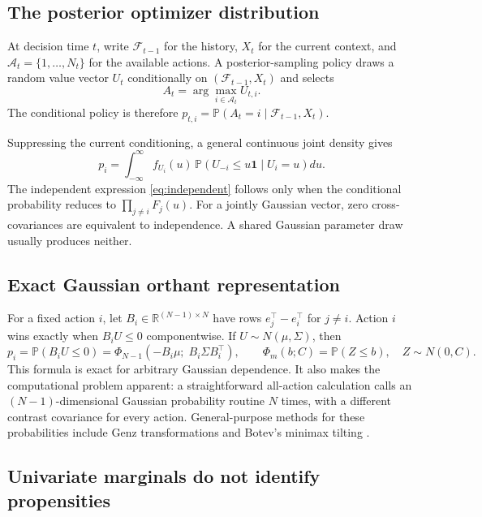 \documentclass[11pt]{article}
\newcommand{\Prob}{\mathbb{P}}
\newcommand{\R}{\mathbb{R}}
\newcommand{\ind}{\mathbf{1}}
\begin{document}
\subsection{The posterior optimizer distribution}

At decision time $t$, write $\mathcal{F}_{t-1}$ for the history, $X_t$ for the current context, and $\mathcal{A}_t = \{1, \ldots, N_t\}$ for the available actions. A posterior-sampling policy draws a random value vector $U_t$ conditionally on $(\mathcal{F}_{t-1}, X_t)$ and selects
\[
A_t = \arg\max_{i \in \mathcal{A}_t} U_{t,i}.
\]
The conditional policy is therefore $p_{t,i} = \Prob(A_t = i \mid \mathcal{F}_{t-1}, X_t)$.

Suppressing the current conditioning, a general continuous joint density gives
\[
p_i
=
\int_{-\infty}^{\infty}
f_{U_i}(u)\,
\Prob\!\left( U_{-i} \le u \ind \mid U_i = u \right)
du.
\]
The independent expression \eqref{eq:independent} follows only when the conditional probability reduces to $\prod_{j \ne i} F_j(u)$. For a jointly Gaussian vector, zero cross-covariances are equivalent to independence. A shared Gaussian parameter draw usually produces neither.

\subsection{Exact Gaussian orthant representation}

For a fixed action $i$, let $B_i \in \R^{(N-1) \times N}$ have rows $e_j^\top - e_i^\top$ for $j \ne i$. Action $i$ wins exactly when $B_i U \le 0$ componentwise. If $U \sim N(\mu, \Sigma)$, then
\begin{equation}
\label{eq:orthant}
p_i
=
\Prob(B_i U \le 0)
=
\Phi_{N-1}\!\left( -B_i \mu;\; B_i \Sigma B_i^\top \right),
\qquad
\Phi_m(b; C) = \Prob(Z \le b),\quad Z \sim N(0, C).
\end{equation}
This formula is exact for arbitrary Gaussian dependence. It also makes the computational problem apparent: a straightforward all-action calculation calls an $(N-1)$-dimensional Gaussian probability routine $N$ times, with a different contrast covariance for every action. General-purpose methods for these probabilities include Genz transformations \parencite{genz1992} and Botev's minimax tilting \parencite{botev2017}.

\subsection{Univariate marginals do not identify propensities}
\end{document}
